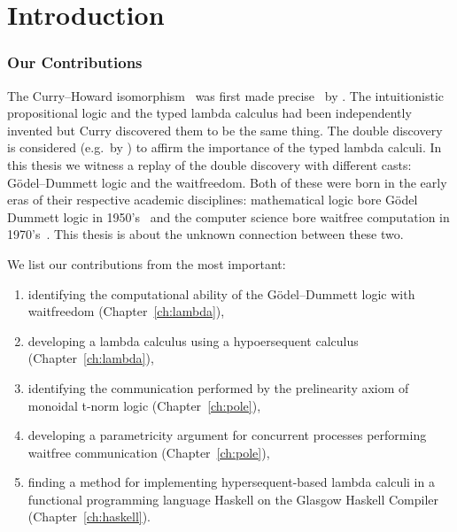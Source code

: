 \chapter{Introduction}

\subsection{Our Contributions}

The Curry--Howard isomorphism~\citep{curryhoward} was first made
precise~\citep[p.97]{curryhoward} by \citet[\textbf{9}E and
\textbf{9}F]{curry1974combinatory}.
The intuitionistic propositional logic and the typed lambda calculus
had been independently invented but Curry discovered them to be the same thing.
The double discovery is considered (e.g.~by \citet{wadler2012propositions})
to affirm the importance of the typed lambda calculi.
In this thesis we witness a replay of the double discovery with
different casts: G\"odel--Dummett logic and the waitfreedom.
Both of these were born in the early eras of their respective academic
disciplines:
mathematical logic bore G\"odel Dummett logic in
1950's~\citep{dummett59}
and the
computer science bore waitfree computation in
1970's~\citep{lamport1979make}.
This thesis is about the unknown connection between these two.

We list our contributions from the most important:
\begin{enumerate}
 \item identifying the computational ability of the
G\"odel--Dummett logic with waitfreedom (Chapter~\ref{ch:lambda}),
 \item developing a lambda calculus using
       a hypoersequent calculus (Chapter~\ref{ch:lambda}),
 \item identifying the communication performed by the prelinearity axiom
       of monoidal t-norm logic (Chapter~\ref{ch:pole}),
 \item developing a parametricity argument for
       concurrent processes performing waitfree communication (Chapter~\ref{ch:pole}),
 \item finding a method for implementing hypersequent-based lambda calculi in a
       functional programming language Haskell on the Glasgow Haskell
       Compiler (Chapter~\ref{ch:haskell}).
\end{enumerate}

